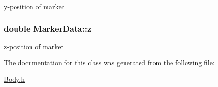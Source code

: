 y-\/position of marker 

\subsubsection[{\texorpdfstring{z}{z}}]{\setlength{\rightskip}{0pt plus 5cm}double Marker\+Data\+::z}\hypertarget{class_marker_data_adc00ff164746747a7b379a94abf8a2df}{}\label{class_marker_data_adc00ff164746747a7b379a94abf8a2df}


z-\/position of marker 



The documentation for this class was generated from the following file\+:\begin{DoxyCompactItemize}
\item 
\hyperlink{_body_8h}{Body.\+h}\end{DoxyCompactItemize}
